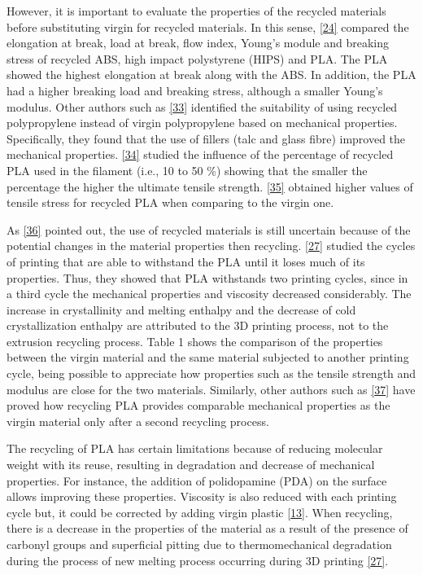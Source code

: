 \documentclass[conference,final,]{IEEEtran}
\begin{document}
However, it is important to evaluate the properties of the recycled
materials before substituting virgin for recycled materials. In this
sense, \protect\hyperlink{ref-Kumar2018b}{{[}24{]}} compared the
elongation at break, load at break, flow index, Young's module and
breaking stress of recycled ABS, high impact polystyrene (HIPS) and PLA.
The PLA showed the highest elongation at break along with the ABS. In
addition, the PLA had a higher breaking load and breaking stress,
although a smaller Young's modulus. Other authors such as
\protect\hyperlink{ref-Gu2016}{{[}33{]}} identified the suitability of
using recycled polypropylene instead of virgin polypropylene based on
mechanical properties. Specifically, they found that the use of fillers
(talc and glass fibre) improved the mechanical properties.
\protect\hyperlink{ref-Babagowda2018}{{[}34{]}} studied the influence of
the percentage of recycled PLA used in the filament (i.e., 10 to 50 \%)
showing that the smaller the percentage the higher the ultimate tensile
strength. \protect\hyperlink{ref-Pinho2020}{{[}35{]}} obtained higher
values of tensile stress for recycled PLA when comparing to the virgin
one.

As \protect\hyperlink{ref-Suarez2020}{{[}36{]}} pointed out, the use of
recycled materials is still uncertain because of the potential changes
in the material properties then recycling.
\protect\hyperlink{ref-Zhao2018}{{[}27{]}} studied the cycles of
printing that are able to withstand the PLA until it loses much of its
properties. Thus, they showed that PLA withstands two printing cycles,
since in a third cycle the mechanical properties and viscosity decreased
considerably. The increase in crystallinity and melting enthalpy and the
decrease of cold crystallization enthalpy are attributed to the 3D
printing process, not to the extrusion recycling process. Table 1 shows
the comparison of the properties between the virgin material and the
same material subjected to another printing cycle, being possible to
appreciate how properties such as the tensile strength and modulus are
close for the two materials. Similarly, other authors such as
\protect\hyperlink{ref-Lanzotti2019}{{[}37{]}} have proved how recycling
PLA provides comparable mechanical properties as the virgin material
only after a second recycling process.

The recycling of PLA has certain limitations because of reducing
molecular weight with its reuse, resulting in degradation and decrease
of mechanical properties. For instance, the addition of polidopamine
(PDA) on the surface allows improving these properties. Viscosity is
also reduced with each printing cycle but, it could be corrected by
adding virgin plastic \protect\hyperlink{ref-Zhao2018a}{{[}13{]}}. When
recycling, there is a decrease in the properties of the material as a
result of the presence of carbonyl groups and superficial pitting due to
thermomechanical degradation during the process of new melting process
occurring during 3D printing \protect\hyperlink{ref-Zhao2018}{{[}27{]}}.
\end{document}
